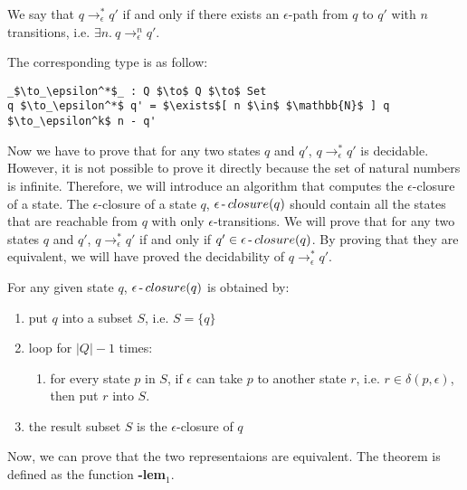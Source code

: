 \begin{defn}
\noindent We say that \(q \to_\epsilon^* q'\) if and only if there
exists an \(\epsilon\)-path from \(q\) to \(q'\) with \(n\) transitions, i.e. \(\exists n.\ q \to_\epsilon^n q'\). 
\end{defn}

\par The corresponding type is as follow: 
\begin{lstlisting}[mathescape=true,xleftmargin=.3\textwidth]
_$\to_\epsilon^*$_ : Q $\to$ Q $\to$ Set
q $\to_\epsilon^*$ q' = $\exists$[ n $\in$ $\mathbb{N}$ ] q $\to_\epsilon^k$ n - q'
\end{lstlisting}

\par Now we have to prove that for any two states \(q\) and \(q'\), 
\(q \to_\epsilon^* q'\) is decidable. However, it is not possible to
prove it directly because the set of natural numbers is
infinite. Therefore, we will introduce an algorithm that computes the
\(\epsilon\)-closure of a state. The \(\epsilon\)-closure of a state
\(q\), \(\epsilon\operatorname{-} closure(q)\) should contain all the states
that are reachable from \(q\) with only \(\epsilon\)-transitions. We will prove that for any two states
\(q\) and \(q'\), \(q \to_\epsilon^* q'\) if and only if \(q' \in \epsilon\operatorname{-} closure(q)\). By proving that they are equivalent, we
will have proved the decidability of \(q \to_\epsilon^* q'\). 

\begin{defn}
\noindent For any given state \(q\), \(\epsilon\operatorname{-} closure(q)\) is obtained by: 
\begin{enumerate}[nolistsep]
  \item put \(q\) into a subset \(S\), i.e. \(S = \{q\}\)
  \item loop for \(|Q| - 1\) times: 
  \begin{enumerate}
    \item for every state \(p\) in \(S\), if \(\epsilon\) can take
      \(p\) to another state \(r\), i.e. \(r \in
        \delta (p,\epsilon)\), then put \(r\) into \(S\). 
  \end{enumerate}
  \item the result subset \(S\) is the \(\epsilon\)-closure of \(q\)
\end{enumerate}
\end{defn}

\par Now, we can prove that the two representaions are equivalent. The
theorem is defined as the function \mmb{\to_\epsilon^*\!}\textbf{-lem\(_1\)}. 

